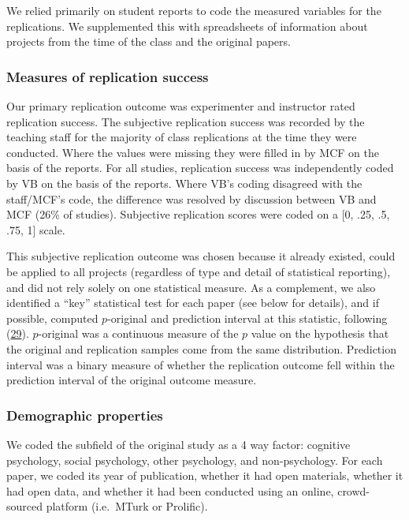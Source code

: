 \documentclass[
  english,
  a4paper,
]{article}
\begin{document}
We relied primarily on student reports to code the measured variables for the replications. We supplemented this with spreadsheets of information about projects from the time of the class and the original papers.

\hypertarget{measures-of-replication-success}{%
\subsubsection{Measures of replication success}\label{measures-of-replication-success}}

Our primary replication outcome was experimenter and instructor rated replication success. The subjective replication success was recorded by the teaching staff for the majority of class replications at the time they were conducted. Where the values were missing they were filled in by MCF on the basis of the reports. For all studies, replication success was independently coded by VB on the basis of the reports. Where VB's coding disagreed with the staff/MCF's code, the difference was resolved by discussion between VB and MCF (26\% of studies). Subjective replication scores were coded on a {[}0, .25, .5, .75, 1{]} scale.

This subjective replication outcome was chosen because it already existed, could be applied to all projects (regardless of type and detail of statistical reporting), and did not rely solely on one statistical measure. As a complement, we also identified a ``key'' statistical test for each paper (see below for details), and if possible, computed \(p\)-original and prediction interval at this statistic, following (\protect\hyperlink{ref-mathur2020}{29}). \(p\)-original was a continuous measure of the \(p\) value on the hypothesis that the original and replication samples come from the same distribution. Prediction interval was a binary measure of whether the replication outcome fell within the prediction interval of the original outcome measure.

\hypertarget{demographic-properties}{%
\subsubsection{Demographic properties}\label{demographic-properties}}

We coded the subfield of the original study as a 4 way factor: cognitive psychology, social psychology, other psychology, and non-psychology. For each paper, we coded its year of publication, whether it had open materials, whether it had open data, and whether it had been conducted using an online, crowd-sourced platform (i.e.~MTurk or Prolific).
\end{document}
